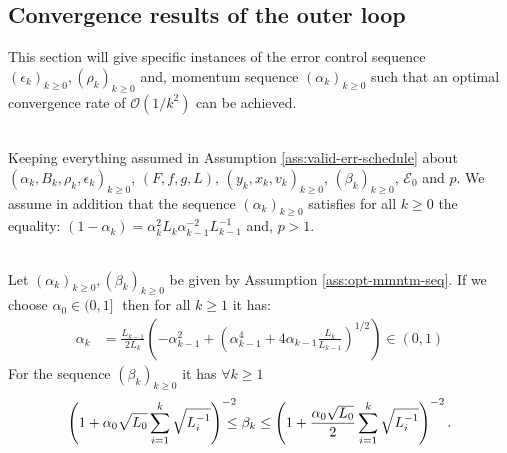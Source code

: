 \documentclass[12pt]{article}
\begin{document}
    \subsection{Convergence results of the outer loop}
        This section will give specific instances of the error control sequence $(\epsilon_k)_{k \ge 0}, (\rho_k)_{k \ge0}$ and, momentum sequence $(\alpha_k)_{k \ge0}$ such that an optimal convergence rate of $\mathcal O(1/k^2)$ can be achieved. 
        \begin{assumption}\;\label{ass:opt-mmntm-seq}\\
            Keeping everything assumed in Assumption \ref{ass:valid-err-schedule} about $(\alpha_k, B_k, \rho_k, \epsilon_k)_{k \ge 0}$, $(F, f, g, L)$, $(y_k, x_k, v_k)_{k \ge 0}$, $(\beta_k)_{k \ge 0}$, $\mathcal E_0$ and $p$. 
            We assume in addition that the sequence $(\alpha_k)_{k \ge 0}$ satisfies for all $k \ge 0$ the equality: $(1 - \alpha_k) = \alpha_{k}^2L_k\alpha_{k - 1}^{-2}L_{k - 1}^{-1}$ and, $p > 1$. 
        \end{assumption}
        \begin{lemma}\;\label{lemma:opt-mmntm-seq}\\
            Let $(\alpha_k)_{k \ge 0}, (\beta_k)_{k \ge 0}$ be given by Assumption \ref{ass:opt-mmntm-seq}. 
            If we choose $\alpha_0 \in (0, 1]\;$ then for all $k \ge 1$ it has: 
            \begin{align}\label{eqn:lemma:opt-mmntm-seq-result1}
                \alpha_k &=
                \frac{L_{k - 1}}{2L_k}\left(
                    - \alpha_{k - 1}^2 + \left(
                        \alpha_{k - 1}^4 + 4 \alpha_{k - 1}\frac{L_k}{L_{k - 1}}
                    \right)^{1/2}
                \right) \in (0, 1)
            \end{align}
            For the sequence $(\beta_k)_{k \ge 0}$ it has $\forall k \ge 1$
            \begin{align}\label{ineq:lemma:opt-mmntm-seq-result2}
                \left(
                    1 + \alpha_0\sqrt{L_0}\sum_{i = 1}^{k}\sqrt{L_i^{-1}}
                \right)^{-2}
                \hspace{-1em}\le 
                \beta_k
                \le 
                \left(
                    1 + \frac{\alpha_0\sqrt{L_0}}{2}\sum_{i = 1}^{k}\sqrt{L_i^{-1}}
                \right)^{-2}. 
            \end{align}
        \end{lemma}
\end{document}
